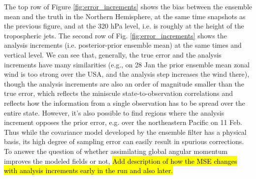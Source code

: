 The top row of Figure \ref{fig:error_increments} shows the bias between the ensemble mean and the truth in the Northern Hemisphere, at the same time snapshots as the previous figure, and at the 320 hPa level, i.e. is roughly at the height of the tropospheric jets. 
The second row of Fig. \ref{fig:error_increments} shows the analysis increments (i.e. posterior-prior ensemble mean) at the same times and vertical level. 
We can see that, generally, the true error and the analysis increments have many similarities (e.g., on 28 Jan the prior ensemble mean zonal wind is too strong over the USA, and the analysis step increases the wind there), though 
the analysis increments are also an order of magnitude smaller than the true error, which reflects the miniscule state-to-observation correlations and reflects how the information from a single observation has to be spread over the entire state. 
However, it's also possible to find regions where the analysis increment opposes the prior error, e.g. over the northeastern Pacific on 11 Feb. 
Thus while the covariance model developed by the ensemble filter has a physical basis, its high degree of sampling error can easily result in spurious corrections. 
To answer the question of whether assimilating global angular momentum improves the modeled fields or not, 
\hl{Add description of how the MSE changes with analysis increments early in the run and also later.}  



